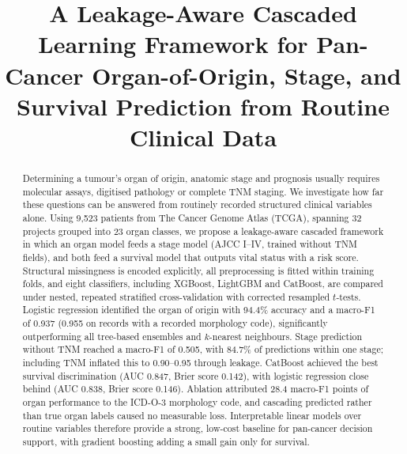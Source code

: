 \documentclass[conference]{IEEEtran}
\begin{document}
\title{A Leakage-Aware Cascaded Learning Framework for Pan-Cancer Organ-of-Origin, Stage, and Survival Prediction from Routine Clinical Data}

\author{
\and
{}
}

\maketitle

\begin{abstract}
Determining a tumour's organ of origin, anatomic stage and prognosis usually requires molecular assays, digitised pathology or complete TNM staging. We investigate how far these questions can be answered from routinely recorded structured clinical variables alone. Using 9,523 patients from The Cancer Genome Atlas (TCGA), spanning 32 projects grouped into 23 organ classes, we propose a leakage-aware cascaded framework in which an organ model feeds a stage model (AJCC I--IV, trained without TNM fields), and both feed a survival model that outputs vital status with a risk score. Structural missingness is encoded explicitly, all preprocessing is fitted within training folds, and eight classifiers, including XGBoost, LightGBM and CatBoost, are compared under nested, repeated stratified cross-validation with corrected resampled $t$-tests. Logistic regression identified the organ of origin with 94.4\% accuracy and a macro-F1 of 0.937 (0.955 on records with a recorded morphology code), significantly outperforming all tree-based ensembles and $k$-nearest neighbours. Stage prediction without TNM reached a macro-F1 of 0.505, with 84.7\% of predictions within one stage; including TNM inflated this to 0.90--0.95 through leakage. CatBoost achieved the best survival discrimination (AUC 0.847, Brier score 0.142), with logistic regression close behind (AUC 0.838, Brier score 0.146). Ablation attributed 28.4 macro-F1 points of organ performance to the ICD-O-3 morphology code, and cascading predicted rather than true organ labels caused no measurable loss. Interpretable linear models over routine variables therefore provide a strong, low-cost baseline for pan-cancer decision support, with gradient boosting adding a small gain only for survival.
\end{abstract}
\end{document}
